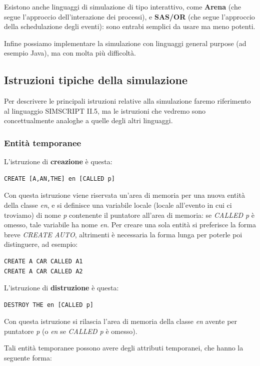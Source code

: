 \documentclass[11pt]{book}
\begin{document}
Esistono anche linguaggi di simulazione di tipo interattivo, come {\bf
  Arena} (che segue l'approccio dell'interazione dei processi), e {\bf
  SAS/OR} (che segue l'approccio della schedulazione degli eventi):
sono entrabi semplici da usare ma meno potenti.

Infine possiamo implementare la simulazione con linguaggi general
purpose (ad esempio Java), ma con molta pi\`u difficolt\`a.

\subsection{Istruzioni tipiche della simulazione}
Per descrivere le principali istruzioni relative alla simulazione
faremo riferimento al linguaggio SIMSCRIPT II.5, ma le istruzioni che
vedremo sono concettualmente analoghe a quelle degli altri linguaggi.

\subsubsection{Entit\`a temporanee}
L'istruzione di {\bf creazione} \`e questa:

\begin{verbatim}
CREATE [A,AN,THE] en [CALLED p]
\end{verbatim}

Con questa istruzione viene riservata un'area di memoria per una nuova
entit\`a della classe {\em en}, e si definisce una variabile locale
(locale all'evento in cui ci troviamo) di nome {\em p} contenente il
puntatore all'area di memoria: se {\em CALLED p} \`e omesso, tale
variabile ha nome {\em en}. Per creare una sola entit\`a si preferisce
la forma breve {\em CREATE AUTO}, altrimenti \`e necessaria la forma
lunga per poterle poi distinguere, ad esempio:

\begin{verbatim}
CREATE A CAR CALLED A1 
CREATE A CAR CALLED A2
\end{verbatim}

L'istruzione di {\bf distruzione} \`e questa:

\begin{verbatim}
DESTROY THE en [CALLED p]
\end{verbatim}

Con questa istruzione si rilascia l'area di memoria della classe {\em
  en} avente per puntatore {\em p} (o {\em en} se {\em CALLED p} \`e
omesso).

Tali entit\`a temporanee possono avere degli attributi temporanei, che
hanno la seguente forma:
\end{document}
